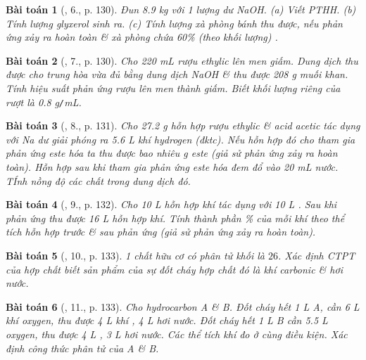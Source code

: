 \documentclass{article}
\newtheorem{baitoan}{Bài toán}
\begin{document}
\begin{baitoan}[\cite{An_Hoa_Hoc_nang_cao_8_9}, 6., p. 130]
	Đun {\rm8.9 kg} {\rm{}} với 1 lượng dư {\rm NaOH}. (a) Viết {\rm PTHH}. (b) Tính lượng glyxerol sinh ra. (c) Tính lượng xà phòng bánh thu được, nếu phản ứng xảy ra hoàn toàn \& xà phòng chứa {\rm60\%} (theo khối lượng) {\rm{}}.
\end{baitoan}

\begin{baitoan}[\cite{An_Hoa_Hoc_nang_cao_8_9}, 7., p. 130]
	Cho {\rm220 mL} rượu ethylic lên men giấm. Dung dịch thu được cho trung hòa vừa đủ bằng dung dịch {\rm NaOH} \& thu được {\rm208 g} muối khan. Tính hiệu suất phản ứng rượu lên men thành giấm. Biết khối lượng riêng của rượt là {\rm0.8 g{\tt/}mL}.
\end{baitoan}

\begin{baitoan}[\cite{An_Hoa_Hoc_nang_cao_8_9}, 8., p. 131]
	Cho {\rm27.2 g} hỗn hợp rượu ethylic \& acid acetic tác dụng với {\rm Na} dư giải phóng ra {\rm5.6 L} khí hydrogen (đktc). Nếu hỗn hợp đó cho tham gia phản ứng este hóa ta thu được bao nhiêu {\rm g} este (giả sử phản ứng xảy ra hoàn toàn). Hỗn hợp sau khi tham gia phản ứng este hóa đem đổ vào {\rm20 mL} nước. TÍnh nồng độ các chất trong dung dịch đó.
\end{baitoan}

\begin{baitoan}[\cite{An_Hoa_Hoc_nang_cao_8_9}, 9., p. 132]
	Cho {\rm10 L} hỗn hợp khí {\rm{}} tác dụng với {\rm10 L }. Sau khi phản ứng thu được {\rm16 L} hỗn hợp khí. Tính thành phần {\rm\%} của mỗi khí theo thể tích hỗn hợp trước \& sau phản ứng (giả sử phản ứng xảy ra hoàn toàn).
\end{baitoan}

\begin{baitoan}[\cite{An_Hoa_Hoc_nang_cao_8_9}, 10., p. 133]
	1 chất hữu cơ có phân tử khối là $26$. Xác định {\rm CTPT} của hợp chất biết sản phẩm của sự đốt cháy hợp chất đó là khí carbonic \& hơi nước.
\end{baitoan}

\begin{baitoan}[\cite{An_Hoa_Hoc_nang_cao_8_9}, 11., p. 133]
	Cho hydrocarbon A \& B. Đốt cháy hết {\rm1 L} A, cần {\rm6 L} khí oxygen, thu được {\rm4 L} khí {\rm{}}, {\rm4 L} hơi nước. Đốt cháy hết {\rm1 L} B cần {\rm5.5 L} oxygen, thu được {\rm4 L , 3 L} hơi nước. Các thể tích khí đo ở cùng điều kiện. Xác định công thức phân tử của A \& B.
\end{baitoan}
\end{document}
